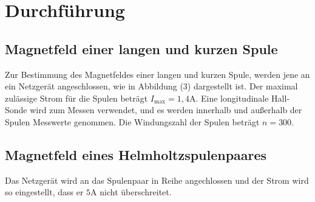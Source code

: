 \section{Durchführung}
\label{sec:Durchführung}

\subsection{Magnetfeld einer langen und kurzen Spule}
Zur Bestimmung des Magnetfeldes einer langen und kurzen Spule, werden jene an ein Netzgerät angeschlossen, wie in Abbildung (3) dargestellt ist.
Der maximal zulässige Strom für die Spulen beträgt $I_\text{max} = 1,4 \si{\ampere}$. 
Eine longitudinale Hall-Sonde wird zum Messen verwendet, und es werden innerhalb und außerhalb der Spulen Messwerte genommen. 
Die Windungszahl der Spulen beträgt $n = 300$.

\subsection{Magnetfeld eines Helmholtzspulenpaares}
Das Netzgerät wird an das Spulenpaar in Reihe angechlossen und der Strom wird so eingestellt, dass er $5 \si{\ampere} $ nicht überschreitet.
